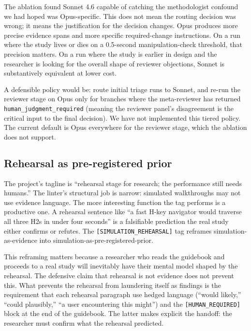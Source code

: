 The ablation found Sonnet 4.6 capable of catching the methodologist confound we had hoped was Opus-specific. This does not mean the routing decision was wrong; it means the justification for the decision changes. Opus produces more precise evidence spans and more specific required-change instructions. On a run where the study lives or dies on a 0.5-second manipulation-check threshold, that precision matters. On a run where the study is earlier in design and the researcher is looking for the overall shape of reviewer objections, Sonnet is substantively equivalent at lower cost.

A defensible policy would be: route initial triage runs to Sonnet, and re-run the reviewer stage on Opus only for branches where the meta-reviewer has returned \texttt{human\_judgment\_required} (meaning the reviewer panel's disagreement is the critical input to the final decision). We have not implemented this tiered policy. The current default is Opus everywhere for the reviewer stage, which the ablation does not support.

\subsection{Rehearsal as pre-registered prior}

The project's tagline is ``rehearsal stage for research; the performance still needs humans.'' The linter's structural job is narrow: simulated walkthroughs may not use evidence language. The more interesting function the tag performs is a productive one. A rehearsal sentence like ``a fast H-key navigator would traverse all three H2s in under four seconds'' is a falsifiable prediction the real study either confirms or refutes. The \texttt{[SIMULATION\_REHEARSAL]} tag reframes simulation-as-evidence into simulation-as-pre-registered-prior.

This reframing matters because a researcher who reads the guidebook and proceeds to a real study will inevitably have their mental model shaped by the rehearsal. The defensive claim that rehearsal is not evidence does not prevent this. What prevents the rehearsal from laundering itself as findings is the requirement that each rehearsal paragraph use hedged language (``would likely,'' ``could plausibly,'' ``a user encountering this might'') and the \texttt{[HUMAN\_REQUIRED]} block at the end of the guidebook. The latter makes explicit the handoff: the researcher must confirm what the rehearsal predicted.
